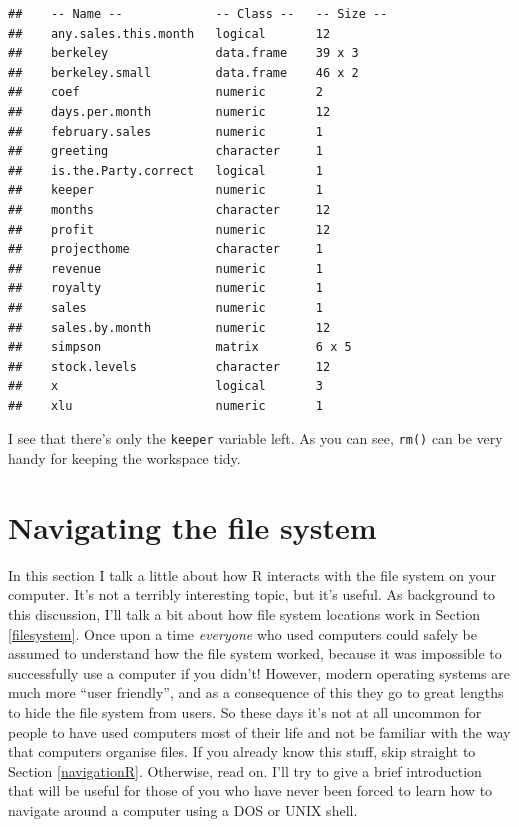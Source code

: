 \documentclass[
]{book}
\begin{document}
\begin{verbatim}
##    -- Name --             -- Class --   -- Size --
##    any.sales.this.month   logical       12        
##    berkeley               data.frame    39 x 3    
##    berkeley.small         data.frame    46 x 2    
##    coef                   numeric       2         
##    days.per.month         numeric       12        
##    february.sales         numeric       1         
##    greeting               character     1         
##    is.the.Party.correct   logical       1         
##    keeper                 numeric       1         
##    months                 character     12        
##    profit                 numeric       12        
##    projecthome            character     1         
##    revenue                numeric       1         
##    royalty                numeric       1         
##    sales                  numeric       1         
##    sales.by.month         numeric       12        
##    simpson                matrix        6 x 5     
##    stock.levels           character     12        
##    x                      logical       3         
##    xlu                    numeric       1
\end{verbatim}

I see that there's only the \texttt{keeper} variable left. As you can see, \texttt{rm()} can be very handy for keeping the workspace tidy.

\hypertarget{navigation}{%
\section{Navigating the file system}\label{navigation}}

In this section I talk a little about how R interacts with the file system on your computer. It's not a terribly interesting topic, but it's useful. As background to this discussion, I'll talk a bit about how file system locations work in Section \ref{filesystem}. Once upon a time \emph{everyone} who used computers could safely be assumed to understand how the file system worked, because it was impossible to successfully use a computer if you didn't! However, modern operating systems are much more ``user friendly'', and as a consequence of this they go to great lengths to hide the file system from users. So these days it's not at all uncommon for people to have used computers most of their life and not be familiar with the way that computers organise files. If you already know this stuff, skip straight to Section \ref{navigationR}. Otherwise, read on. I'll try to give a brief introduction that will be useful for those of you who have never been forced to learn how to navigate around a computer using a DOS or UNIX shell.
\end{document}

